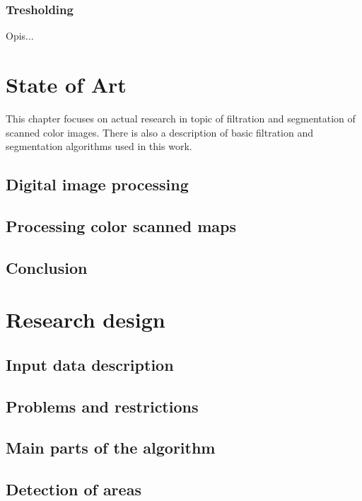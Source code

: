 \documentclass[a4paper,onecolumn,oneside,12pt]{memoir}
\begin{document}
\subsection{Tresholding}

Opis...



\chapter{State of Art}

This chapter focuses on actual research in topic of filtration and segmentation of scanned color
images. There is also a description of basic filtration and segmentation algorithms used in this
work.

\section{Digital image processing}

\section{Processing color scanned maps}

\section{Conclusion}


\chapter{Research design}

\section{Input data description}

\section{Problems and restrictions}

\section{Main parts of the algorithm}

\section{Detection of areas}
\end{document}
